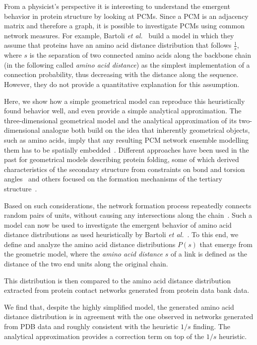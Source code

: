 \documentclass[
reprint,
twocolumn,
amsmath,amssymb,superscriptaddress,aps,
pre]{revtex4-1}
\begin{document}
From a physicist's perspective it is interesting to understand the emergent behavior in protein structure by looking at PCMs. Since a PCM is an adjacency matrix and therefore a graph, it is possible to investigate PCMs using common network measures. For example, Bartoli \textit{et al.}~\cite{bartoli2008effecta} build a model in which they assume that proteins have an amino acid distance distribution that follows $\frac{1}{s}$, where $s$ is the separation of two connected amino acids along the backbone chain (in the following called \emph{amino acid distance}) as the simplest implementation of a connection probability, thus decreasing with the distance along the sequence. However, they do not provide a quantitative explanation for this assumption. 

Here, we show how a simple geometrical model can reproduce this heuristically found behavior well, and even provide a simple analytical approximation. The three-dimensional geometrical model and the analytical approximation of its two-dimensional analogue both build on the idea that inherently geometrical objects, such as amino acids, imply that any resulting PCM network ensemble modelling them has to be spatially embedded~\cite{molkenthin2016scaling, molkenthin2020self}. 
Different approaches have been used in the past for geometrical models describing protein folding, some of which derived characteristics of the secondary structure from constraints on bond and torsion angles~\cite{bhattacharjee2013flory,Danielsson2010,Molkenthin2011} and others focused on the formation mechanisms of the tertiary structure~\cite{molkenthin2016scaling, molkenthin2020self}. 

Based on such considerations, the network formation process repeatedly connects random pairs of units, without causing any intersections along the chain~\cite{molkenthin2016scaling}. Such a model can now be used to investigate the emergent behavior of amino acid distance distributions as used heuristically by Bartoli \textit{et al.}~\cite{bartoli2008effecta}. To this end, we define and analyze the amino acid distance distributions $P(s)$ that emerge from the geometric model, where the \emph{amino acid distance} $s$ of a link is defined as the distance of the two end units along the original chain.


This distribution is then compared to the amino acid distance distribution extracted from protein contact networks generated from protein data bank data. 

We find that, despite the highly simplified model, the generated amino acid distance distribution is in agreement with the one observed in networks generated from PDB data and roughly consistent with the heuristic $1/s$ finding. The analytical approximation provides a correction term on top of the $1/s$ heuristic.
\end{document}
